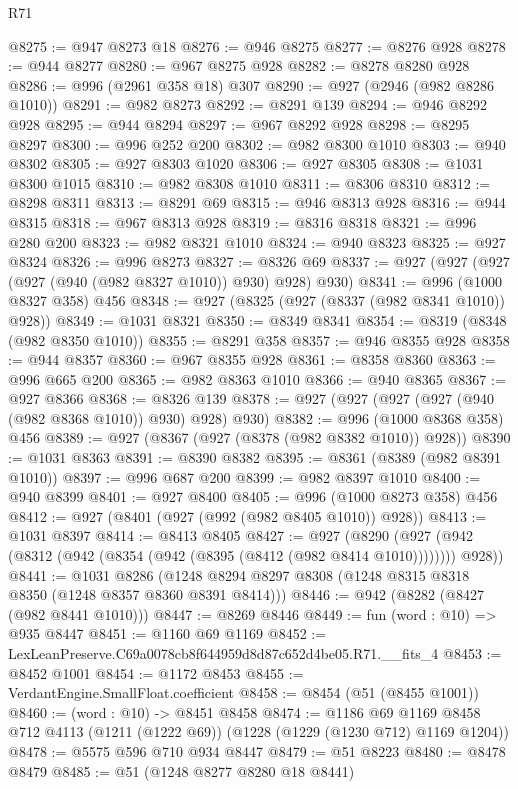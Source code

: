 \begin{lexlean}{R71}
\begin{coremodule}
@8275 := @947 @8273 @18
@8276 := @946 @8275
@8277 := @8276 @928
@8278 := @944 @8277
@8280 := @967 @8275 @928
@8282 := @8278 @8280 @928
@8286 := @996 (@2961 @358 @18) @307
@8290 := @927 (@2946 (@982 @8286 @1010))
@8291 := @982 @8273
@8292 := @8291 @139
@8294 := @946 @8292 @928
@8295 := @944 @8294
@8297 := @967 @8292 @928
@8298 := @8295 @8297
@8300 := @996 @252 @200
@8302 := @982 @8300 @1010
@8303 := @940 @8302
@8305 := @927 @8303 @1020
@8306 := @927 @8305
@8308 := @1031 @8300 @1015
@8310 := @982 @8308 @1010
@8311 := @8306 @8310
@8312 := @8298 @8311
@8313 := @8291 @69
@8315 := @946 @8313 @928
@8316 := @944 @8315
@8318 := @967 @8313 @928
@8319 := @8316 @8318
@8321 := @996 @280 @200
@8323 := @982 @8321 @1010
@8324 := @940 @8323
@8325 := @927 @8324
@8326 := @996 @8273
@8327 := @8326 @69
@8337 := @927 (@927 (@927 (@927 (@940 (@982 @8327 @1010)) @930) @928) @930)
@8341 := @996 (@1000 @8327 @358) @456
@8348 := @927 (@8325 (@927 (@8337 (@982 @8341 @1010)) @928))
@8349 := @1031 @8321
@8350 := @8349 @8341
@8354 := @8319 (@8348 (@982 @8350 @1010))
@8355 := @8291 @358
@8357 := @946 @8355 @928
@8358 := @944 @8357
@8360 := @967 @8355 @928
@8361 := @8358 @8360
@8363 := @996 @665 @200
@8365 := @982 @8363 @1010
@8366 := @940 @8365
@8367 := @927 @8366
@8368 := @8326 @139
@8378 := @927 (@927 (@927 (@927 (@940 (@982 @8368 @1010)) @930) @928) @930)
@8382 := @996 (@1000 @8368 @358) @456
@8389 := @927 (@8367 (@927 (@8378 (@982 @8382 @1010)) @928))
@8390 := @1031 @8363
@8391 := @8390 @8382
@8395 := @8361 (@8389 (@982 @8391 @1010))
@8397 := @996 @687 @200
@8399 := @982 @8397 @1010
@8400 := @940 @8399
@8401 := @927 @8400
@8405 := @996 (@1000 @8273 @358) @456
@8412 := @927 (@8401 (@927 (@992 (@982 @8405 @1010)) @928))
@8413 := @1031 @8397
@8414 := @8413 @8405
@8427 := @927
    (@8290 (@927 (@942 (@8312 (@942 (@8354 (@942 (@8395 (@8412 (@982 @8414 @1010)))))))) @928))
@8441 := @1031
    @8286
    (@1248 @8294 @8297 @8308 (@1248 @8315 @8318 @8350 (@1248 @8357 @8360 @8391 @8414)))
@8446 := @942 (@8282 (@8427 (@982 @8441 @1010)))
@8447 := @8269 @8446
@8449 := fun (word : @10) => @935 @8447
@8451 := @1160 @69 @1169
@8452 := LexLeanPreserve.C69a0078cb8f644959d8d87c652d4be05.R71.__fits_4
@8453 := @8452 @1001
@8454 := @1172 @8453
@8455 := VerdantEngine.SmallFloat.coefficient
@8458 := @8454 (@51 (@8455 @1001))
@8460 := (word : @10) -> @8451 @8458
@8474 := @1186
    @69
    @1169
    @8458
    @712
    @4113
    (@1211 (@1222 @69))
    (@1228 (@1229 (@1230 @712) @1169 @1204))
@8478 := @5575 @596 @710 @934 @8447
@8479 := @51 @8223
@8480 := @8478 @8479
@8485 := @51 (@1248 @8277 @8280 @18 @8441)

\end{coremodule}
\end{lexlean}
